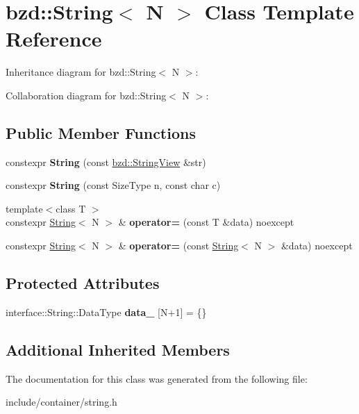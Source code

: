 \hypertarget{classbzd_1_1String}{}\section{bzd\+:\+:String$<$ N $>$ Class Template Reference}
\label{classbzd_1_1String}


Inheritance diagram for bzd\+:\+:String$<$ N $>$\+:


Collaboration diagram for bzd\+:\+:String$<$ N $>$\+:
\subsection*{Public Member Functions}
\begin{DoxyCompactItemize}
\item 
\mbox{\label{classbzd_1_1String_aff8cd7bf19d9708c6a9b38987e6c05e6}} 
constexpr {\bfseries String} (const \hyperlink{classbzd_1_1impl_1_1StringView}{bzd\+::\+String\+View} \&str)
\item 
\mbox{\label{classbzd_1_1String_aff2af681b19a06f393eade0c66d9c6b3}} 
constexpr {\bfseries String} (const Size\+Type n, const char c)
\item 
\mbox{\label{classbzd_1_1String_a33f9fa7717b2ecd10cd10faad2988fb0}} 
{\footnotesize template$<$class T $>$ }\\constexpr \hyperlink{classbzd_1_1String}{String}$<$ N $>$ \& {\bfseries operator=} (const T \&data) noexcept
\item 
\mbox{\label{classbzd_1_1String_ae7b8dc4131da190aac39864ebd788a07}} 
constexpr \hyperlink{classbzd_1_1String}{String}$<$ N $>$ \& {\bfseries operator=} (const \hyperlink{classbzd_1_1String}{String}$<$ N $>$ \&data) noexcept
\end{DoxyCompactItemize}
\subsection*{Protected Attributes}
\begin{DoxyCompactItemize}
\item 
\mbox{\label{classbzd_1_1String_ad7d2b75b56d85466e3ba3e8f6bd22b79}} 
interface\+::\+String\+::\+Data\+Type {\bfseries data\+\_\+} \mbox{[}N+1\mbox{]} = \{\}
\end{DoxyCompactItemize}
\subsection*{Additional Inherited Members}


The documentation for this class was generated from the following file\+:\begin{DoxyCompactItemize}
\item 
include/container/string.\+h\end{DoxyCompactItemize}

